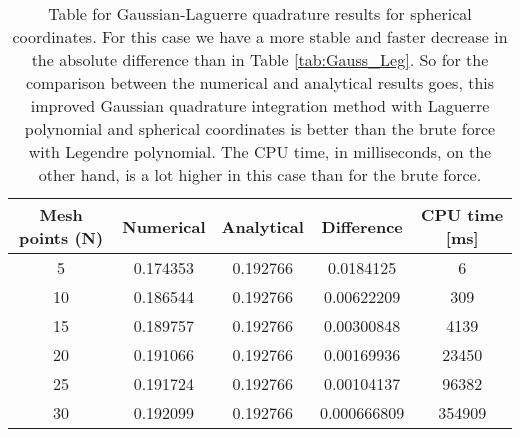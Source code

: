 \documentclass[12pt,a4paper,english]{article}
\begin{document}
\begin{table}[htbp]
	\centering
	\begin{tabular}{ |c|c|c|c|c| }
		\hline \rule{0pt}{13pt}
		Mesh points (N) & Numerical & Analytical & Difference & CPU time [ms]\\
		\hline \rule{0pt}{13pt}
		5 & 0.174353 & 0.192766 & 0.0184125 & 6 \\
		\hline \rule{0pt}{13pt}
		10 & 0.186544 & 0.192766 & 0.00622209 & 309 \\
		\hline \rule{0pt}{13pt}
		15 & 0.189757 & 0.192766 & 0.00300848 & 4139 \\
		\hline \rule{0pt}{13pt}
		20 & 0.191066 & 0.192766 & 0.00169936 & 23450 \\
		\hline \rule{0pt}{13pt}
		25 & 0.191724 & 0.192766 & 0.00104137 & 96382 \\
		\hline \rule{0pt}{13pt}
		30 & 0.192099 & 0.192766 & 0.000666809 & 354909 \\
		\hline 
	\end{tabular}
	\caption{Table for Gaussian-Laguerre quadrature results for spherical coordinates. For this case we have a more stable and faster decrease in the absolute difference than in Table \ref{tab:Gauss_Leg}. So for the comparison between the numerical and analytical results goes, this improved Gaussian quadrature integration method with Laguerre polynomial and spherical coordinates is better than the brute force with Legendre polynomial. The CPU time, in milliseconds, on the other hand, is a lot higher in this case than for the brute force.}
	\label{tab:Gauss_Lag}
\end{table}
\end{document}
